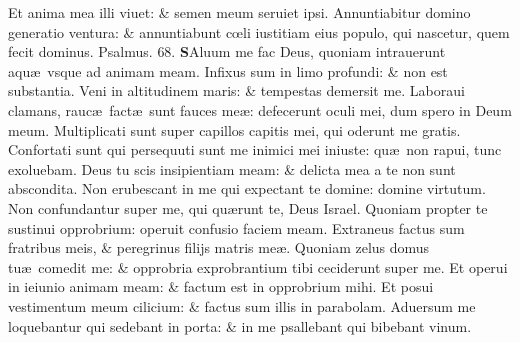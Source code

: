 \documentclass[a5paper,10pt]{book}
\def\ae{æ}
\def\oe{œ}
\begin{document}
\begin{multicols*}{2}
\newline \color{red} E\color{black}t anima mea illi viuet: \& semen meum seruiet ipsi.
\newline \color{red} A\color{black}nnuntiabitur domino generatio ventura: \& annuntiabunt c\oe li iustitiam eius populo, qui nascetur, quem fecit dominus. \quad \color{red} Psalmus. \hypertarget{ps68}{68.} \color{black}
\vspace{-1em}
\lettrine[lines=2]{\bfseries \color{red} S}{}Aluum me fac Deus, quoniam intrauerunt aqu\ae \ vsque ad animam meam.
\newline \color{red} I\color{black}nfixus sum in limo profundi: \& non est substantia.
\newline \color{red} V\color{black}eni in altitudinem maris: \& tempestas demersit me.
\newline \color{red} L\color{black}aboraui clamans, rauc\ae \ fact\ae \ sunt fauces me\ae : defecerunt oculi mei, dum spero in Deum meum.
\newline \color{red} M\color{black}ultiplicati sunt super capillos capitis mei, qui oderunt me gratis.
\newline \color{red} C\color{black}onfortati sunt qui persequuti sunt me inimici mei iniuste: qu\ae \ non rapui, tunc exoluebam.
\newline \color{red} D\color{black}eus tu scis insipientiam meam: \& delicta mea a te non sunt abscondita.
\newline \color{red} N\color{black}on erubescant in me qui expectant te domine: domine virtutum.
\newline \color{red} N\color{black}on confundantur super me, qui qu\ae runt te, Deus Israel.
\newline \color{red} Q\color{black}uoniam propter te sustinui opprobrium: operuit confusio faciem meam.
\newline \color{red} E\color{black}xtraneus factus sum fratribus meis, \& peregrinus filijs matris me\ae .
\newline \color{red} Q\color{black}uoniam zelus domus tu\ae \ comedit me: \& opprobria exprobrantium tibi ceciderunt super me.
\newline \color{red} E\color{black}t operui in ieiunio animam meam: \& factum est in opprobrium mihi.
\newline \color{red} E\color{black}t posui vestimentum meum cilicium: \& factus sum illis in parabolam.
\newline \color{red} A\color{black}duersum me loquebantur qui sedebant in porta: \& in me psallebant qui bibebant vinum.

\end{multicols*}
\end{document}
